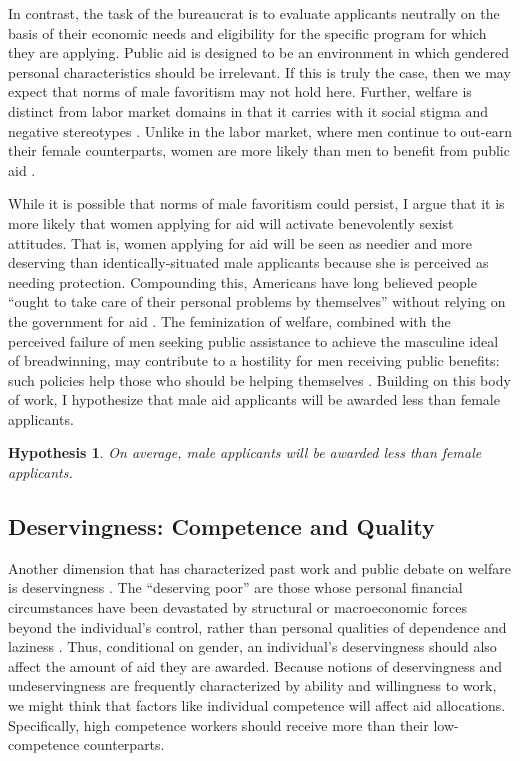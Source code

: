 \documentclass[12pt]{article}%
\newtheorem{hypothesis}{Hypothesis}
\begin{document}
\begin{doublespace}
In contrast, the task of the bureaucrat is to evaluate applicants neutrally on the basis of their economic needs and eligibility for the specific program for which they are applying. Public aid is designed to be an environment in which gendered personal characteristics should be irrelevant. If this is truly the case, then we may expect that norms of male favoritism may not hold here. Further, welfare is distinct from labor market domains in that it carries with it social stigma \citep{soss_lessons_1999} and negative stereotypes \citep{foster_welfare_2008, esping-andersen_welfare_2015}. Unlike in the labor market, where men continue to out-earn their female counterparts, women are more likely than men to benefit from public aid \citep{fraser_women_1989, lundberg-love_women_2012, abramovitz_regulating_2017}.


While it is possible that norms of male favoritism could persist, I argue that it is more likely that women applying for aid will activate benevolently sexist attitudes. That is, women applying for aid will be seen as needier and more deserving than identically-situated male applicants because she is perceived as needing protection. Compounding this, Americans have long believed people ``ought to take care of their personal problems by themselves” without relying on the government for aid \citep{sniderman_coping_1977}. The feminization of welfare, combined with the perceived failure of men seeking public assistance to achieve the masculine ideal of breadwinning, may contribute to a hostility for men receiving public benefits: such policies help those who should be helping themselves \citep{bobocel_justice-based_1998, katz_racial_1988, sniderman_symbolic_1986, sniderman_beyond_1996, mclosky_ethos}. Building on this body of work, I hypothesize that male aid applicants will be awarded less than female applicants.

\begin{hypothesis} \label{hyp:first}
	On average, male applicants will be awarded less than female applicants.
\end{hypothesis}

\subsection*{Deservingness: Competence and Quality}
Another dimension that has characterized past work and public debate on welfare is deservingness \citep{schneider_social_1993, van2017social, gilens_why_2000}. The ``deserving poor” are those whose personal financial circumstances have been devastated by structural or macroeconomic forces beyond the individual’s control, rather than personal qualities of dependence and laziness \citep{van_oorschot_who_nodate}. Thus, conditional on gender, an individual’s deservingness should also affect the amount of aid they are awarded. Because notions of deservingness and undeservingness are frequently characterized by ability and willingness to work, we might think that factors like individual competence will affect aid allocations. Specifically, high competence workers should receive more than their low-competence counterparts.



\end{doublespace}
\end{document}
